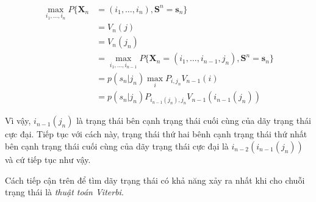 \documentclass[14pt, a4paper]{article}
\numberwithin{equation}{section}
\numberwithin{figure}{section}
\theoremstyle{sltheorem}
\theoremstyle{soltheorem}
\numberwithin{dl}{section}
\numberwithin{md}{section}
\numberwithin{vd}{section}
\begin{document}
    \begin{equation*}
        \begin{aligned}
            \max_{i_1, \dots, i_n} P \lbrace \mathbf{X}_n &= (i_1, \dots, i_n), \mathbf{S}^n = \mathbf{s}_n \rbrace \\
            &= V_n(j) \\
            &= V_n (j_n) \\
            &= \max_{i_1, \dots, i_{n-1}} P \lbrace \mathbf{X}_n = (i_1, \dots, i_{n-1}, j_n), \mathbf{S}^n = \mathbf{s}_n \rbrace \\
            &= p(s_n \vert j_n) \max_i P_{i, j_n} V_{n-1}(i) \\
            &= p(s_n \vert j_n) P_{i_{n-1}(j_n), j_n} V_{n-1} (i_{n-1}(j_n))
        \end{aligned}
    \end{equation*}

    Vì vậy, $i_{n-1}(j_n)$ là trạng thái bên cạnh trạng thái cuối cùng của dãy trạng thái cực đại.
    Tiếp tục với cách này, trạng thái thứ hai bênh cạnh trạng thái thứ nhất bên cạnh trạng thái cuối cùng của dãy trạng thái cực đại là $i_{n-2}(i_{n-1}(j_n))$ và cứ tiếp tục như vậy.

    Cách tiếp cận trên để tìm dãy trạng thái có khả năng xảy ra nhất khi cho chuỗi trạng thái là \textit{thuật toán Viterbi}.

    \newpage
    \printbibliography[title={TÀI LIỆU THAM KHẢO}]
\end{document}
